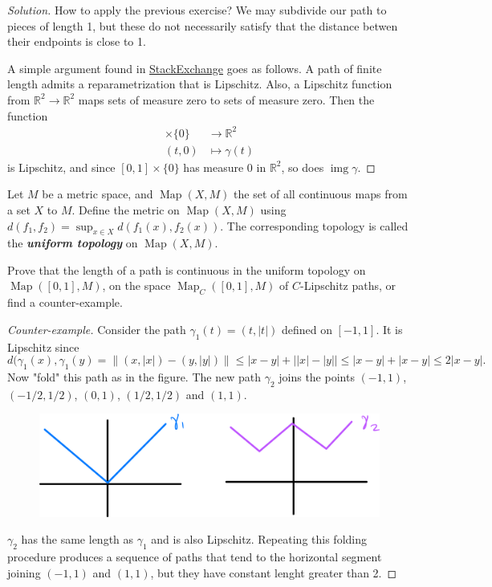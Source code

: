 \documentclass{article}
\newcommand{\R}{\mathbb{R}}
\DeclareMathOperator{\img}{img}
\DeclareMathOperator{\Map}{Map}
\begin{document}
\begin{proof}[Solution]
	{\color{red}How to apply the previous exercise? We may subdivide our path to pieces of length 1, but these do not necessarily satisfy that the distance betwen their endpoints is close to 1.}
	
	A simple argument found in \href{https://math.stackexchange.com/questions/2106497/fa-b-has-measure-zero/}{StackExchange} goes as follows. A path of finite length admits a reparametrization that is Lipschitz. Also, a Lipschitz function from $\R^2\to\R^2$ maps sets of measure zero to sets of measure zero. Then the function
	\begin{align*}
		[0,1]\times\{0\}&\to\R^2\\
		(t,0)&\mapsto\gamma(t)
	\end{align*}
	is Lipschitz, and since $[0,1]\times\{0\}$ has measure 0 in $\R^2$, so does $\img\gamma$.
	

\end{proof}
\begin{defn}
	Let $M$ be a metric space, and $\Map(X,M)$ the set of all continuous maps from a set $X$ to $M$. Define the metric on $\Map(X,M)$ using $d(f_1,f_2) = \sup_{x\in X} d(f_1(x), f_2(x))$. The corresponding topology is called the \textbf{\textit{uniform topology}} on $\Map(X,M)$.
\end{defn}
\begin{exercise}
	Prove that the length of a path is continuous in the uniform topology on $\Map([0,1],M)$, on the space $\Map_C([0,1],M)$ of $C$-Lipschitz paths, or find a counter-example.
\end{exercise}
\begin{proof}[Counter-example]
	Consider the path $\gamma_1(t)=(t,|t|)$ defined on $[-1,1]$. It is Lipschitz since
	\[d(\gamma_1(x),\gamma_1(y)=\|(x,|x|)-(y,|y|)\|\leq|x-y|+\Big||x|-|y|\Big|\leq|x-y|+|x-y|\leq2|x-y|.\]
	Now "fold" this path as in the figure. The new path $\gamma_2$ joins the points $(-1,1)$, $(-1/2,1/2)$, $(0,1)$, $(1/2,1/2)$ and $(1,1)$.
	\begin{figure}[H]
		\centering
		\includegraphics[width=0.7\linewidth]{lip}
	\end{figure}
	$\gamma_2$ has the same length as $\gamma_1$ and is also Lipschitz. Repeating this folding procedure produces a sequence of paths that tend to the horizontal segment joining $(-1,1)$ and $(1,1)$, but they have constant lenght greater than 2.	
\end{proof}
\end{document}
